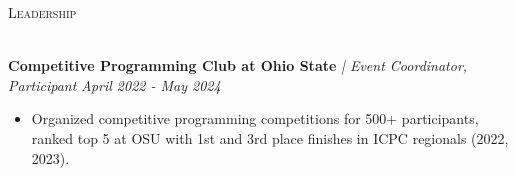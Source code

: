 \documentclass[letterpaper]{article}
\newcommand{\lineunder} {
    \vspace*{-8pt} \\
    \hspace*{-18pt} \hrulefill \\
}
\newcommand{\header} [1] {
    {\hspace*{-18pt}\vspace*{6pt} \textsc{#1}}
    \vspace*{-6pt} \lineunder
}
\begin{document}
\header{Leadership}
\vspace{1mm}

    \textbf{Competitive Programming Club at Ohio State} \textit{| Event Coordinator, Participant} \hfill \textsl{April 2022 - May 2024}\\
    \vspace{-2mm}
    \begin{itemize} \itemsep -1mm
    
        \item Organized competitive programming competitions for 500+ participants, ranked top 5 at OSU with 1st and 3rd place finishes in ICPC regionals (2022, 2023).

    \end{itemize}
    \vspace{-1mm}
\end{document}
